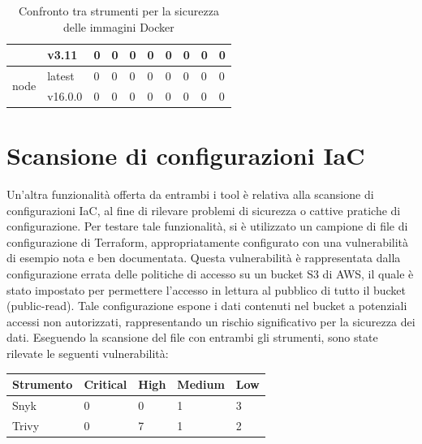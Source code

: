\begin{table}[h]
\begin{tabularx}{\textwidth}{|l|l|X|X|X|X|X|X|X|X|}
                                 & v3.11          & 0                                  & 0                                   & 0            & 0            & 0              & 0             & 0            & 0            \\ \hline
      \multirow{2}{*}{node}      & latest         & 0                                  & 0                                   & 0            & 0            & 0              & 0             & 0            & 0            \\ \cline{2-10}
                                 & v16.0.0        & 0                                  & 0                                   & 0            & 0            & 0              & 0             & 0            & 0            \\ \hline
   \end{tabularx}
   \caption{Confronto tra strumenti per la sicurezza delle immagini Docker}
   \label{tab:confronto_sicurezza}
\end{table}

\section{Scansione di configurazioni IaC}
Un'altra funzionalità offerta da entrambi i tool è relativa alla scansione di configurazioni IaC, al fine di rilevare problemi di sicurezza o cattive pratiche di configurazione. Per testare tale funzionalità, si è utilizzato un campione di file di configurazione di Terraform, appropriatamente configurato con una vulnerabilità di esempio nota e ben documentata. Questa vulnerabilità è rappresentata dalla configurazione errata delle politiche di accesso su un bucket S3 di AWS, il quale è stato impostato per permettere l'accesso in lettura al pubblico di tutto il bucket (public-read). Tale configurazione espone i dati contenuti nel bucket a potenziali accessi non autorizzati, rappresentando un rischio significativo per la sicurezza dei dati.
Eseguendo la scansione del file con entrambi gli strumenti, sono state rilevate le seguenti vulnerabilità:

\begin{center}
   \begin{tabularx}{0.8\textwidth}{|X|X|X|X|X|}
      \hline
      \textbf{Strumento} & \textbf{Critical} & \textbf{High} & \textbf{Medium} & \textbf{Low} \\
      \hline
      Snyk               & 0                 & 0             & 1               & 3            \\
      \hline
      Trivy              & 0                 & 7             & 1               & 2            \\
      \hline
   \end{tabularx}
\end{center}


